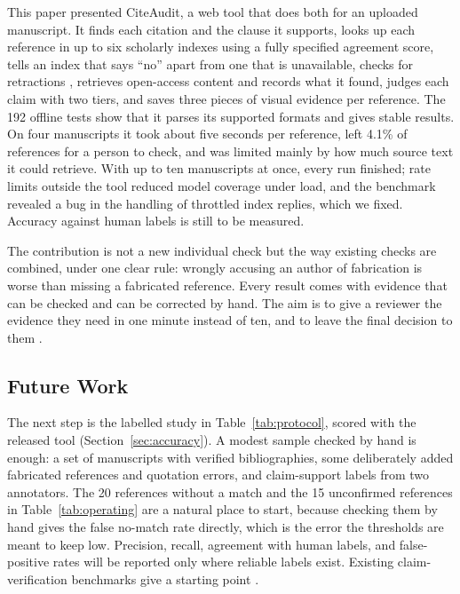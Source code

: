 \documentclass{article}
\begin{document}
This paper presented CiteAudit, a web tool that does both for an uploaded manuscript. It finds each citation and the clause it supports, looks up each reference in up to six scholarly indexes \cite{hendricks2020,priem2022,kinney2023,europepmc2015,piwowar2018} using a fully specified agreement score, tells an index that says ``no'' apart from one that is unavailable, checks for retractions \cite{crossref2023}, retrieves open-access content and records what it found, judges each claim with two tiers, and saves three pieces of visual evidence per reference. The 192 offline tests show that it parses its supported formats and gives stable results. On four manuscripts it took about five seconds per reference, left 4.1\% of references for a person to check, and was limited mainly by how much source text it could retrieve. With up to ten manuscripts at once, every run finished; rate limits outside the tool reduced model coverage under load, and the benchmark revealed a bug in the handling of throttled index replies, which we fixed. Accuracy against human labels is still to be measured.

The contribution is not a new individual check but the way existing checks are combined, under one clear rule: wrongly accusing an author of fabrication is worse than missing a fabricated reference. Every result comes with evidence that can be checked and can be corrected by hand. The aim is to give a reviewer the evidence they need in one minute instead of ten, and to leave the final decision to them \cite{hicks2015}.

\subsection{Future Work}
\label{sec:future}

The next step is the labelled study in Table~\ref{tab:protocol}, scored with the released tool (Section~\ref{sec:accuracy}). A modest sample checked by hand is enough: a set of manuscripts with verified bibliographies, some deliberately added fabricated references and quotation errors, and claim-support labels from two annotators. The 20 references without a match and the 15 unconfirmed references in Table~\ref{tab:operating} are a natural place to start, because checking them by hand gives the false no-match rate directly, which is the error the thresholds are meant to keep low. Precision, recall, agreement with human labels, and false-positive rates will be reported only where reliable labels exist. Existing claim-verification benchmarks give a starting point \cite{thorne2018,vladika2023}.
\end{document}
